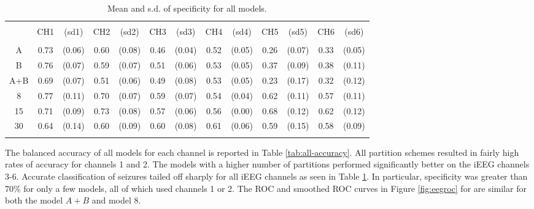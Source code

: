 \begin{table}[!htbp] \centering 
\begin{tabular}{@{\extracolsep{-5pt}} ccccccccccccc} 
\\[-1.8ex]\hline 
\hline \\[-1.8ex] 
 & CH1 & (sd1) & CH2 & (sd2) & CH3 & (sd3) & CH4 & (sd4) & CH5 & (sd5) & CH6 & (sd6) \\ 
\hline \\[-1.8ex] 
A & 0.73 & (0.06) & 0.60 & (0.08) & 0.46 & (0.04) & 0.52 & (0.05) & 0.26 & (0.07) & 0.33 & (0.05) \\ 
B & 0.76 & (0.07) & 0.59 & (0.07) & 0.51 & (0.06) & 0.53 & (0.05) & 0.37 & (0.09) & 0.38 & (0.11) \\ 
A+B & 0.69 & (0.07) & 0.51 & (0.06) & 0.49 & (0.08) & 0.53 & (0.05) & 0.23 & (0.17) & 0.32 & (0.12) \\ 
8 & 0.77 & (0.11) & 0.70 & (0.07) & 0.59 & (0.07) & 0.54 & (0.04) & 0.62 & (0.11) & 0.57 & (0.11) \\ 
15 & 0.71 & (0.09) & 0.73 & (0.08) & 0.57 & (0.06) & 0.56 & (0.00) & 0.68 & (0.12) & 0.62 & (0.12) \\ 
30 & 0.64 & (0.14) & 0.60 & (0.09) & 0.60& (0.08) & 0.61 & (0.06) & 0.59 & (0.15) & 0.58 & (0.09) \\ 
\hline \\[-1.8ex] 
\end{tabular} 
  \caption{Mean and s.d. of specificity for all models.} 
  \label{tab:all-specificity} 
\end{table}


The balanced accuracy of all models for each channel is
reported in Table \ref{tab:all-accuracy}. All partition
schemes resulted in fairly high rates of accuracy for channels 1 and 2. The models with a higher number of 
partitions performed significantly better on the 
iEEG channels 3-6. Accurate classification of seizures tailed off sharply for all iEEG channels as seen in Table \ref{tab:all-specificity}. In particular, specificity was greater than 70\% for only 
a few models, all of which used channels 1 or 2. The ROC and smoothed ROC curves in Figure \ref{fig:eegroc}
for are similar for both the model $A + B$ and model $8$. 



